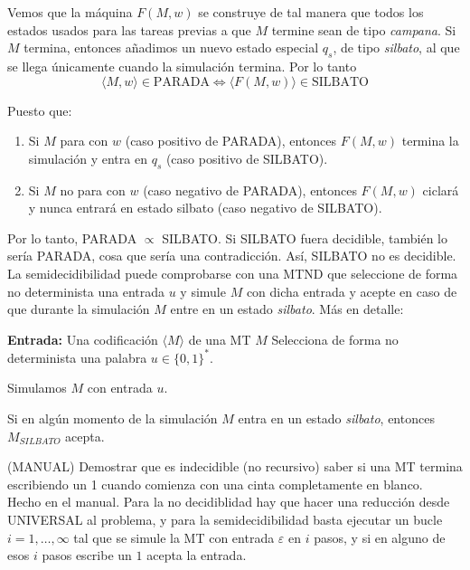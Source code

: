 \begin{ejercicio}
    Vemos que la máquina $F(M,w)$ se construye de tal manera que todos los estados usados para las tareas previas a que 
    $M$ termine sean de tipo \textit{campana}. Si $M$ termina, entonces añadimos un nuevo estado especial $q_s$, de tipo
    \textit{silbato}, al que se llega únicamente cuando la simulación termina. Por lo tanto
    $$\langle M,w \rangle \in \text{PARADA} \iff \langle F(M,w) \rangle \in \text{SILBATO}$$

    Puesto que:
    \begin{enumerate}
        \item Si $M$ para con $w$ (caso positivo de PARADA), entonces $F(M,w)$ termina la simulación y entra en $q_s$ 
        (caso positivo de SILBATO).
        \item Si $M$ no para con $w$ (caso negativo de PARADA), entonces $F(M,w)$ ciclará y nunca 
        entrará en estado silbato (caso negativo de SILBATO).
    \end{enumerate}

    Por lo tanto, PARADA $\propto$ SILBATO. Si SILBATO fuera decidible, también lo sería PARADA, cosa que sería una contradicción.
    Así, SILBATO no es decidible. \\

    La semidecidibilidad puede comprobarse con una MTND que seleccione de forma no determinista una entrada $u$ y simule $M$
    con dicha entrada y acepte en caso de que durante la simulación $M$ entre en un estado \textit{silbato}. Más en detalle:

    \begin{algorithm}
        \caption{MTND $M_{SILBATO}$}
        \label{algorithm:sil-semidecidible}
        \begin{algorithmic}
            \State \textbf{Entrada:} Una codificación $\langle M \rangle$ de una MT $M$
                \State Selecciona de forma no determinista una palabra $u \in \{0,1\}^{*}$.

                \State Simulamos $M$ con entrada $u$.

                \State Si en algún momento de la simulación $M$ entra en un estado \textit{silbato}, entonces 
                $M_{SILBATO}$ acepta.
        \end{algorithmic}
    \end{algorithm}
\end{ejercicio}




\begin{ejercicio}
    (MANUAL) Demostrar que es indecidible (no recursivo) saber si una MT termina escribiendo un 1 cuando comienza con 
    una cinta completamente en blanco. \\

    Hecho en el manual. Para la no decidiblidad hay que hacer una reducción desde UNIVERSAL al problema, y para la 
    semidecidibilidad basta ejecutar un bucle $i =1, \ldots, \infty$ tal que se simule la MT con entrada $\varepsilon$ en
    $i$ pasos, y si en alguno de esos $i$ pasos escribe un $1$ acepta la entrada.
\end{ejercicio}




